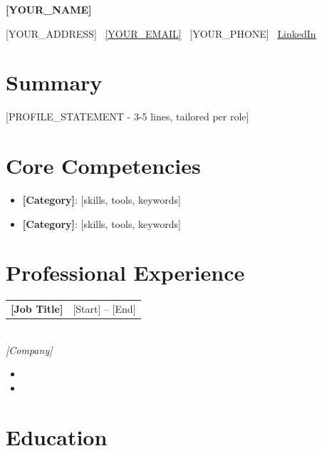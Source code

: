 \documentclass[11pt,a4paper]{article}
\makeatletter
\newcommand{\cvname}[1]{{\centering\fontsize{26}{28}\selectfont\bfseries #1\par}}
\newcommand{\cvcontact}[1]{{\centering\small #1\par}}
\newcommand{\cventry}[4]{%
  \noindent\begin{tabularx}{\linewidth}{@{}X r@{}}
    \textbf{#1} & #2 \\
  \end{tabularx}%
  \\[1pt]
  {\itshape #3\ifthenelse{\equal{#4}{}}{}{, #4}}\par
}
\makeatother
\begin{document}
\cvname{[YOUR_NAME]}
\vspace{2pt}
\cvcontact{[YOUR_ADDRESS] \textbar\ \href{mailto:[YOUR_EMAIL]}{[YOUR_EMAIL]} \textbar\ [YOUR_PHONE] \textbar\ \href{[YOUR_LINKEDIN_URL]}{LinkedIn}}
\vspace{4pt}


\section{Summary}
[PROFILE_STATEMENT - 3-5 lines, tailored per role]


\section{Core Competencies}
\begin{itemize}
\item \textbf{[Category]}: [skills, tools, keywords]
\item \textbf{[Category]}: [skills, tools, keywords]
\end{itemize}


\section{Professional Experience}

\cventry{[Job Title]}{[Start] -- [End]}{[Company]}{[Location]}
\begin{itemize}
\item [Achievement bullet]
\item [Achievement bullet]
\end{itemize}


\section{Education}
\end{document}
